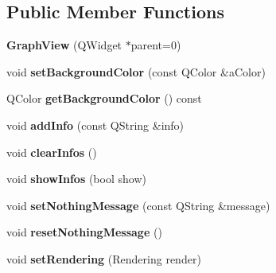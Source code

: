\subsection*{Public Member Functions}
\begin{DoxyCompactItemize}
\item 
\hypertarget{class_graph_view_aac7138d6a1db96a1b8b2ae0f2082d441}{{\bfseries Graph\-View} (Q\-Widget $\ast$parent=0)}\label{class_graph_view_aac7138d6a1db96a1b8b2ae0f2082d441}

\item 
\hypertarget{class_graph_view_a56c324ecc71dbb93843a2d6f05031bd3}{void {\bfseries set\-Background\-Color} (const Q\-Color \&a\-Color)}\label{class_graph_view_a56c324ecc71dbb93843a2d6f05031bd3}

\item 
\hypertarget{class_graph_view_a12b3f76deb9a0f58ab6d685f13e0277c}{Q\-Color {\bfseries get\-Background\-Color} () const }\label{class_graph_view_a12b3f76deb9a0f58ab6d685f13e0277c}

\item 
\hypertarget{class_graph_view_a9de6707cc59059f0e95f9e276ed194df}{void {\bfseries add\-Info} (const Q\-String \&info)}\label{class_graph_view_a9de6707cc59059f0e95f9e276ed194df}

\item 
\hypertarget{class_graph_view_a5c76213d93ea715d809649834c287263}{void {\bfseries clear\-Infos} ()}\label{class_graph_view_a5c76213d93ea715d809649834c287263}

\item 
\hypertarget{class_graph_view_a7adefd39e737bb059a835eedc3bad8a2}{void {\bfseries show\-Infos} (bool show)}\label{class_graph_view_a7adefd39e737bb059a835eedc3bad8a2}

\item 
\hypertarget{class_graph_view_adb54ebd229005b2e6d184badfe2a1f55}{void {\bfseries set\-Nothing\-Message} (const Q\-String \&message)}\label{class_graph_view_adb54ebd229005b2e6d184badfe2a1f55}

\item 
\hypertarget{class_graph_view_aa7a48a19de28c421cbde32ad95de8d84}{void {\bfseries reset\-Nothing\-Message} ()}\label{class_graph_view_aa7a48a19de28c421cbde32ad95de8d84}

\item 
\hypertarget{class_graph_view_a5bdc5aea9d6f43beb99acd58cee970b5}{void {\bfseries set\-Rendering} (Rendering render)}\label{class_graph_view_a5bdc5aea9d6f43beb99acd58cee970b5}


\end{DoxyCompactItemize}
